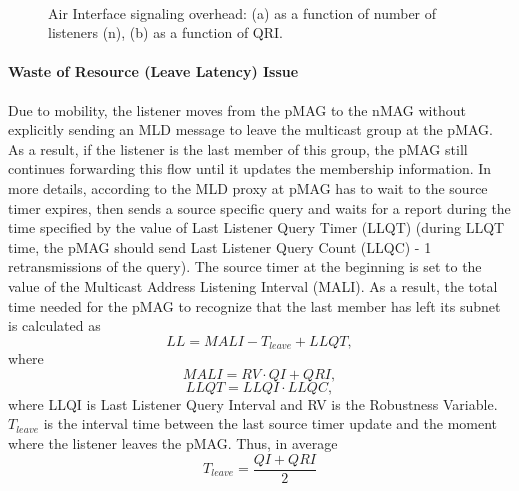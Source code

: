 \begin{figure}[h!]
\centering
{}\,\,\,\,\,\,
\caption[Multicast-related signaling overhead over the air interface.]{Air Interface signaling overhead: (a) as a function of number of listeners (n), (b) as a function of QRI.}
\label{fig:c6_mld}
\end{figure}

\paragraph{Waste of Resource (Leave Latency) Issue}
Due to mobility, the listener moves from the pMAG to the nMAG without explicitly sending an MLD message to leave the multicast group at the pMAG. As a result, if the listener is the last member of this group, the pMAG still continues forwarding this flow until it updates the membership information. In more details, according to \cite{MLDv2} the MLD proxy at pMAG has to wait to the source timer expires, then sends a source specific query and waits for a report during the time specified by the value of Last Listener Query Timer (LLQT) (during LLQT time, the pMAG should send Last Listener Query Count (LLQC) - 1 retransmissions of the query). The source timer at the beginning is set to the value of the Multicast Address Listening Interval (MALI). As a result, the total time needed for the pMAG to recognize that the last member has left its subnet is calculated as \\
\begin{equation}
LL = MALI - T_{leave} + LLQT,
\end{equation}
where 
\begin{equation}
MALI = RV \cdot QI + QRI,
\end{equation}
\begin{equation}
LLQT=  LLQI \cdot LLQC,
\end{equation}
where LLQI is Last Listener Query Interval and RV is the Robustness Variable. 
$T_{leave}$ is the interval time between the last source timer update and the moment where the listener leaves the pMAG. Thus, in average\\
\begin{equation}
T_{leave} = \dfrac{QI+QRI}{2}
\end{equation}

